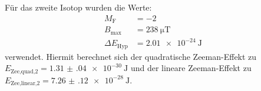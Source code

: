 		\noindent
		Für das zweite Isotop wurden die Werte:
		\begin{align*}
			M_\text{F} &= -2\\
			B_\text{max} &= \SI{238}{\micro\tesla}\\
			\Delta E_\text{Hyp} &= \SI{2.01 e-24}{\joule}
		\end{align*}
		verwendet. Hiermit berechnet sich der quadratische Zeeman-Effekt zu $E_\text{Zee,quad,2} = \SI{1.31(04)e-30}{\joule}$ 
		und der lineare Zeeman-Effekt zu $E_\text{Zee,linear,2} = \SI{7.26(12)e-28}{\joule}$.






	
